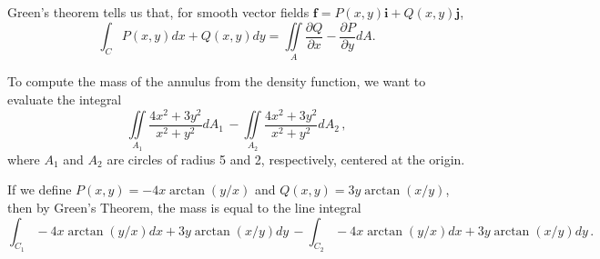 \item

Green's theorem tells us that, for smooth vector fields $\mathbf{f} =
P(x,y)\mathbf{i} + Q(x,y)\mathbf{j}$,
\begin{equation*}
 \int_C \! P(x,y) dx + Q(x,y) dy =
 \iint\limits_A \frac{\partial Q}{\partial x} - \frac{\partial P}{\partial y} dA.
\end{equation*}

To compute the mass of the annulus from the density function, we want to
evaluate the integral \[\iint\limits_{A_1} \! \dfrac{4x^2 + 3y^2}{x^2 + y^2}
dA_1 \, - \iint\limits_{A_2} \! \dfrac{4x^2 + 3y^2}{x^2 + y^2} dA_2 \,,\] where
$A_1$ and $A_2$ are circles of radius 5 and 2, respectively, centered at the
origin.

If we define $P(x,y) = -4x\arctan(y/x)$ and $Q(x,y) = 3y\arctan(x/y)$, then by
Green's Theorem, the mass is equal to the line integral \[\int_{C_1} \!
-4x\arctan(y/x) dx + 3y\arctan(x/y) dy \, - \int_{C_2} \! -4x\arctan(y/x) dx +
3y\arctan(x/y) dy \,.\]


\EEN
